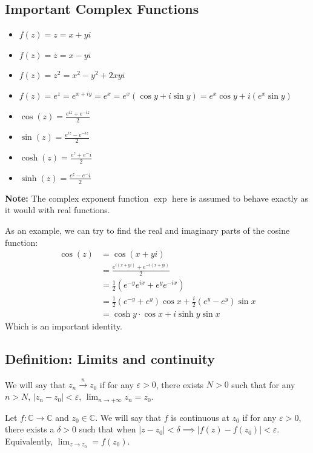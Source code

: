 \subsection{Important Complex Functions}
\begin{itemize}
    \item $f(z)=z=x+yi$
    \item $f(z)=\overline z=x-yi$
    \item $f(z)=z^2=x^2-y^2+2xyi$
    \item $f(z)=e^z=e^{x+iy}=e^x=e^x(\cos y+i\sin y)=e^x\cos y + i(e^x\sin y)$
    \item $\cos(z)=\frac{e^{iz}+e^{-iz}}2$
    \item $\sin(z)=\frac{e^{iz}-e^{-iz}}2$
    \item $\cosh(z)=\frac{e^z+e^-i}{2}$
    \item $\sinh(z)=\frac{e^z-e^-i}{2}$
\end{itemize}
\textbf{Note:} The complex exponent function $\exp$ here is assumed to behave exactly as it would with real functions.

As an example, we can try to find the real and imaginary parts of the cosine function:
\begin{equation*}
\begin{split}
\cos(z)&=\cos(x+yi)\\
&=\frac{e^{i(x+yi)}+e^{-i(x+yi)}}2\\
&=\frac 12 \left(e^{-y}e^{ix}+e^ye^{-ix}\right)\\
&=\frac 12(e^{-y}+e^y)\cos x + \frac i2 (e^y-e^y)\sin x\\
&=\cosh y\cdot \cos x + i \sinh y \sin x
\end{split}
\end{equation*}
Which is an important identity.

\subsection{Definition: Limits and continuity}
We will say that $z_n\stackrel{n}{\rightarrow}z_0$ 
if for any $\varepsilon > 0$, there exists $N > 0$ such that  for any $n > N$, $|z_n-z_0| < \varepsilon$, $\lim_{n\to +\infty} z_n = z_0$.

Let $f:\mathbb C \to \mathbb C$ and $z_0\in \mathbb C$. We will say that $f$ is continuous at $z_0$ if for any $\varepsilon > 0 $, there exists a $\delta > 0$ such that when $|z-z_0| < \delta\implies |f(z)-f(z_0)| < \varepsilon$.
Equivalently, $\lim_{z\to z_0} = f(z_0)$.

